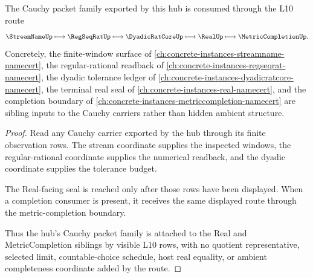 \begin{theorem}\label{thm:cauchy-orphan-real-route}
The Cauchy packet family exported by this hub is consumed through the L10 route
$$
\StreamNameUp \longmapsto \RegSeqRatUp \longmapsto \DyadicRatCoreUp \longmapsto \RealUp \longmapsto \MetricCompletionUp .
$$
Concretely, the finite-window surface of \autoref{ch:concrete-instances-streamname-namecert}, the regular-rational readback of \autoref{ch:concrete-instances-regseqrat-namecert}, the dyadic tolerance ledger of \autoref{ch:concrete-instances-dyadicratcore-namecert}, the terminal real seal of \autoref{ch:concrete-instances-real-namecert}, and the completion boundary of \autoref{ch:concrete-instances-metriccompletion-namecert} are sibling inputs to the Cauchy carriers rather than hidden ambient structure.
\end{theorem}
\begin{proof}
Read any Cauchy carrier exported by the hub through its finite observation rows. The stream coordinate supplies the inspected windows, the regular-rational coordinate supplies the numerical readback, and the dyadic coordinate supplies the tolerance budget.

The Real-facing seal is reached only after those rows have been displayed. When a completion consumer is present, it receives the same displayed route through the metric-completion boundary.

Thus the hub's Cauchy packet family is attached to the Real and MetricCompletion siblings by visible L10 rows, with no quotient representative, selected limit, countable-choice schedule, host real equality, or ambient completeness coordinate added by the route.
\end{proof}
